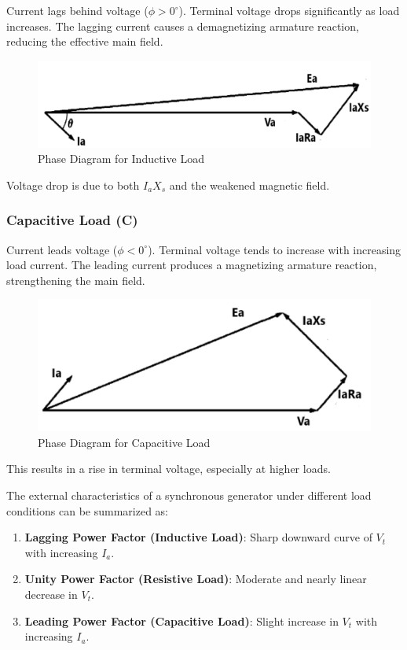 \documentclass[a4paper,12pt]{article}
\begin{document}
	 Current lags behind voltage (\( \phi > 0^\circ \)).
	 Terminal voltage drops significantly as load increases.
	 The lagging current causes a demagnetizing armature reaction, reducing the effective main field.
	 \begin{figure}[H]
	 	\centering
	 	\includegraphics[width=0.7\linewidth]{Images/3}
	 	\caption{Phase Diagram for Inductive Load}
	 	\label{fig:2}
	 \end{figure}
	 Voltage drop is due to both \( I_aX_s \) and the weakened magnetic field.


\subsubsection*{Capacitive Load (C)}

	 Current leads voltage (\( \phi < 0^\circ \)).
	 Terminal voltage tends to increase with increasing load current.
	 The leading current produces a magnetizing armature reaction, strengthening the main field.
	 
	\begin{figure}[H]
		\centering
		\includegraphics[width=0.7\linewidth]{Images/4}
		\caption{  Phase Diagram for Capacitive Load}
		\label{fig:2}
	\end{figure}
	
	This results in a rise in terminal voltage, especially at higher loads.




The external characteristics of a synchronous generator under different load conditions can be summarized as:
\begin{enumerate}
	\item \textbf{Lagging Power Factor (Inductive Load)}: Sharp downward curve of \( V_t \) with increasing \( I_a \).
	\item \textbf{Unity Power Factor (Resistive Load)}: Moderate and nearly linear decrease in \( V_t \).
	\item \textbf{Leading Power Factor (Capacitive Load)}: Slight increase in \( V_t \) with increasing \( I_a \).
\end{enumerate}
\end{document}
